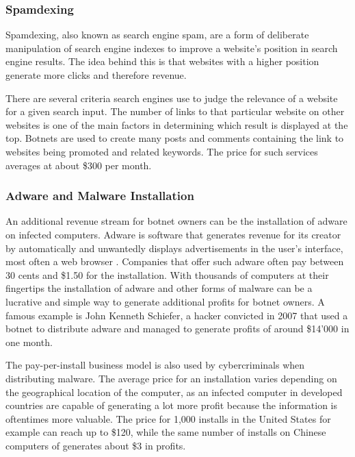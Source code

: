 		\subsubsection{Spamdexing}
		Spamdexing, also known as search engine spam, are a form of deliberate manipulation of search engine indexes to improve a website's position in search engine results. The idea behind this is that websites with a higher position generate more clicks and therefore revenue. 

There are several criteria search engines use to judge the relevance of a website for a given search input. The number of links to that particular website on other websites is one of the main factors in determining which result is displayed at the top. Botnets are used to create many posts and comments containing the link to websites being promoted and related keywords. The price for such services averages at about \$300 per month. \cite{Namestnikov09}

		\subsubsection{Adware and Malware Installation}
		An additional revenue stream for botnet owners can be the installation of adware on infected computers. Adware is software that generates revenue for its creator by automatically and unwantedly displays advertisements in the user's interface, most often a web browser \cite{Malwarebytes19}. Companies that offer such adware often pay between 30 cents and \$1.50 for the installation. With thousands of computers at their fingertips the installation of adware and other forms of malware can be a lucrative and simple way to generate additional profits for botnet owners. A famous example is John Kenneth Schiefer, a hacker convicted in 2007 that used a botnet to distribute adware and managed to generate profits of around \$14'000 in one month. \cite{Namestnikov09}

The pay-per-install business model is also used by cybercriminals when distributing malware. The average price for an installation varies depending on the geographical location of the computer, as an infected computer in developed countries are capable of generating a lot more profit because the information is oftentimes more valuable. The price for 1,000 installs in the United States for example can reach up to \$120, while the same number of installs on Chinese computers of generates about \$3 in profits. \cite{Namestnikov09}

